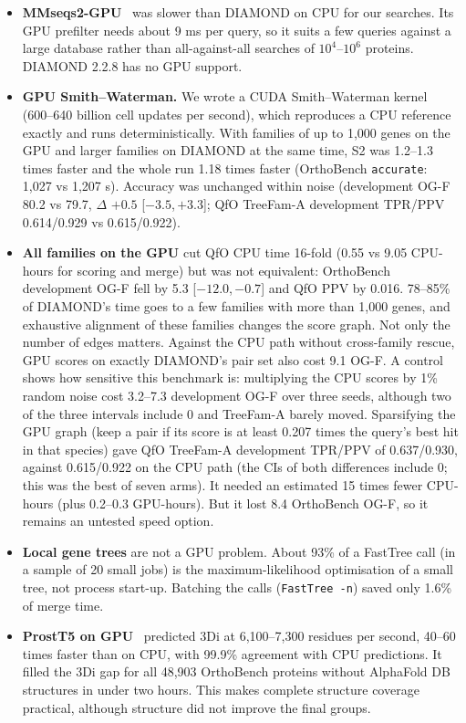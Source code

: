 \documentclass[10pt,letterpaper]{article}
\newcommand{\CI}[2]{[#1,\,#2]}
\begin{document}
\begin{itemize}
\item \textbf{MMseqs2-GPU}~\cite{kallenborn2025mmseqs2gpu} was slower than DIAMOND on CPU for our searches. Its GPU prefilter needs about 9 ms per query, so it suits a few queries against a large database rather than all-against-all searches of $10^4$--$10^6$ proteins. DIAMOND 2.2.8 has no GPU support.
\item \textbf{GPU Smith--Waterman.} We wrote a CUDA Smith--Waterman kernel (600--640 billion cell updates per second), which reproduces a CPU reference exactly and runs deterministically. With families of up to 1,000 genes on the GPU and larger families on DIAMOND at the same time, S2 was 1.2--1.3 times faster and the whole run 1.18 times faster (OrthoBench \texttt{accurate}: 1,027 vs 1,207 s). Accuracy was unchanged within noise (development OG-F 80.2 vs 79.7, $\Delta$ $+0.5$ \CI{$-3.5$}{$+3.3$}; QfO TreeFam-A development TPR/PPV 0.614/0.929 vs 0.615/0.922).
\item \textbf{All families on the GPU} cut QfO CPU time 16-fold (0.55 vs 9.05 CPU-hours for scoring and merge) but was not equivalent: OrthoBench development OG-F fell by 5.3 \CI{$-12.0$}{$-0.7$} and QfO PPV by 0.016. 78--85\% of DIAMOND's time goes to a few families with more than 1,000 genes, and exhaustive alignment of these families changes the score graph. Not only the number of edges matters. Against the CPU path without cross-family rescue, GPU scores on exactly DIAMOND's pair set also cost 9.1 OG-F. A control shows how sensitive this benchmark is: multiplying the CPU scores by 1\% random noise cost 3.2--7.3 development OG-F over three seeds, although two of the three intervals include 0 and TreeFam-A barely moved. Sparsifying the GPU graph (keep a pair if its score is at least 0.207 times the query's best hit in that species) gave QfO TreeFam-A development TPR/PPV of 0.637/0.930, against 0.615/0.922 on the CPU path (the CIs of both differences include 0; this was the best of seven arms). It needed an estimated 15 times fewer CPU-hours (plus 0.2--0.3 GPU-hours). But it lost 8.4 OrthoBench OG-F, so it remains an untested speed option.
\item \textbf{Local gene trees} are not a GPU problem. About 93\% of a FastTree call (in a sample of 20 small jobs) is the maximum-likelihood optimisation of a small tree, not process start-up. Batching the calls (\texttt{FastTree -n}) saved only 1.6\% of merge time.
\item \textbf{ProstT5 on GPU}~\cite{heinzinger2024prostt5} predicted 3Di at 6,100--7,300 residues per second, 40--60 times faster than on CPU, with 99.9\% agreement with CPU predictions. It filled the 3Di gap for all 48,903 OrthoBench proteins without AlphaFold DB structures in under two hours. This makes complete structure coverage practical, although structure did not improve the final groups.

\end{itemize}
\end{document}
